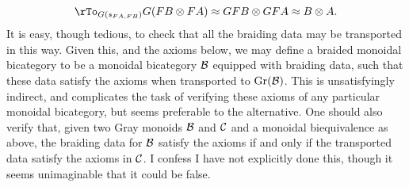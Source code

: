 \documentclass{robinthesisdraft}
\begin{document}
\begin{definition}
\[			\rTo_{G(s_{FA,FB})} G(FB\tn FA) \approx GFB\tn GFA \approx B\tn A.
	\]
	It is easy, though tedious, to check that all the braiding
	data may be transported in this way. Given this, and the axioms below,
	we may define a braided monoidal bicategory to be a monoidal bicategory
	$\mathcal{B}$ equipped with braiding data, such that these data satisfy the axioms
	when transported to $\mathrm{Gr}(\mathcal{B})$. This is unsatisfyingly indirect, and
	complicates the task of verifying these axioms of any particular monoidal
	bicategory, but seems preferable to the alternative. One should
	also verify that, given two Gray monoids $\mathcal{B}$ and $\mathcal{C}$ and a monoidal
	biequivalence as above, the braiding data for $\mathcal{B}$ satisfy the axioms
	if and only if the transported data satisfy the axioms in $\mathcal{C}$. I confess
	I have not explicitly done this, though it seems unimaginable that
	it could be false.
	

\end{definition}
\end{document}
